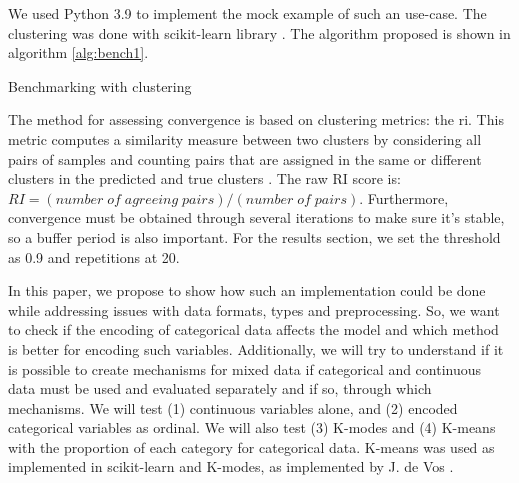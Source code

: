 We used Python 3.9 to implement the mock example of such an use-case. The clustering was done with scikit-learn library \cite{scikit-learn}. The algorithm proposed is shown in algorithm \ref{alg:bench1}.

\begin{algorithm}[hbtp]
\caption{Benchmarking with clustering}
\label{alg:bench1}

\SetAlgoLined






\end{algorithm}

The method for assessing convergence is based on clustering metrics: the \ac{ri}. This metric computes a similarity measure between two clusters by considering all pairs of samples and counting pairs that are assigned in the same or different clusters in the predicted and true clusters \cite{hubertComparingPartitions1985}. The raw RI score is: $RI = (number\; of\; agreeing\; pairs) / (number\; of\; pairs)$.
Furthermore, convergence must be obtained through several iterations to make sure it's stable, so a buffer period is also important. For the results section, we set the threshold as 0.9 and repetitions at 20.

In this paper, we propose to show how such an implementation could be done while addressing issues with data formats, types and preprocessing. So, we want to check if the encoding of categorical data affects the model and which method is better for encoding such variables. Additionally, we will try to understand if it is possible to create mechanisms for mixed data if categorical and continuous data must be used and evaluated separately and if so, through which mechanisms.
We will test (1) continuous variables alone, and (2) encoded categorical variables as ordinal. We will also test (3) K-modes  and (4) K-means with the proportion of each category for categorical data.
K-means was used as implemented in scikit-learn \cite{scikit-learn} and K-modes, as implemented by J. de Vos \cite{devos2015}.
